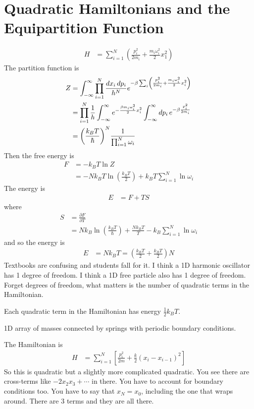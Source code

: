\section{Quadratic Hamiltonians and the Equipartition Function}
\begin{align}
    H &= \sum_{i=1}^{N}\left( 
    \frac{p_i^2}{2m_i} + \frac{m_i\omega_i^2}{2}x_1^2
    \right)
\end{align}
The partition function is
\begin{align}
    Z &= \int_{-\infty}^{\infty} \prod_{i=1}^{N} \frac{dx_i\, dp_i}{h^N}
    e^{-\beta\sum_{i}\left( 
    \frac{p_i^2}{2m_i}
    + \frac{m_i\omega_i^2}{2} x_i^2
    \right)}\\
    &=
    \prod_{i=1}^{N}\frac{1}{h}\int_{-\infty}^{\infty} e^{%
    -\frac{\beta m_i\omega_i^2}{2}x_i^2
    }
    \int_{-\infty}^{\infty} dp_i\,
    e^{-\beta \frac{p_i^2}{2m_i}}\\
    &= {\left(\frac{k_B T}{\hbar}\right)}^{N} \frac{1}{\prod_{i=1}^{N}\omega_i}
\end{align}
Then the free energy is
\begin{align}
    F &= -k_B T \ln Z \\
    &=
    -N k_B T \ln\left( \frac{k_B T}{2} \right)
    +
    k_B T \sum_{i=1}^{N} \ln\omega_i
\end{align}
The energy is
\begin{align}
    E &= F + TS
\end{align}
where
\begin{align}
    S &= \frac{\partial F}{\partial T}\\
    &= Nk_B \ln\left( \frac{k_B T}{\hbar}  \right)
    + \frac{N k_B T}{T}
    - k_B \sum_{i=1}^{N}\ln \omega_i
\end{align}
and so the energy is
\begin{align}
    E &= Nk_B T =
    \left(
    \frac{k_B T}{2}
    + \frac{k_B T}{2}
    \right) N
\end{align}
Textbooks are confusing and students fall for it.
I think a 1D harmonic oscillator has 1 degree of freedom.
I think a 1D free particle also has 1 degree of freedom.
Forget degrees of freedom,
what matters is the number of quadratic terms in the Hamiltonian.

Each quadratic term in the Hamiltonian has energy $\frac{1}{2}k_B T$.

\begin{example}
    1D array of masses connected by springs with periodic boundary conditions.
\end{example}
The Hamiltonian is
\begin{align}
    H &=
    \sum_{i=1}^{N}\left[ 
    \frac{p_i^2}{2m}
    + \frac{k}{2} {\left( x_i - x_{i-1} \right)}^2
    \right]
\end{align}
So this is quadratic but a slightly more complicated quadratic.
You see there are cross-terms like $-2x_2x_3 + \cdots$ in there.
You have to account for boundary conditions too.
You have to say that $x_N = x_0$,
including the one that wraps around.
There are 3 terms and they are all there.

